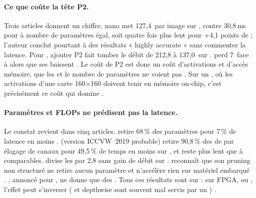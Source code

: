 \paragraph{Ce que coûte la tête P2.} Trois articles donnent un chiffre.  nano
met 127,4\, par image sur , contre 30,8\,ms pour  à nombre de
paramètres égal, soit quatre fois plus lent pour +4,1 points de 
\citep[Table~6]{2023-zhang-drone-yolo-efficient-neural-network} ; l'auteur conclut
pourtant à des résultats « highly accurate » sans commenter la latence. Pour
, ajouter P2 fait tomber le débit de 212,8 à 137,0\, sur 
\citep[Table~5]{2023-fu-efficient-yolov7-drone-enhanced-object}.  perd 7\,
face à  alors que ses  baissent \citep[Table~3,
§5]{2023-cao-gcl-yolo-ghostconv-lightweight-yolo}. Le coût de P2 est donc un coût
d'activations et d'accès mémoire, que les  et le nombre de paramètres ne voient pas
\deduit. Sur un , où les activations d'une carte 160$\times$160 doivent tenir en
mémoire on-chip, c'est précisément ce coût qui domine \deduit.

\paragraph{Paramètres et FLOPs ne prédisent pas la latence.} Le constat revient dans cinq
articles.  retire 68\,\% des paramètres pour 7\,\% de latence en moins
\citep[Table~3]{2022-liu-sf-yolov5-lightweight-small-object}. 
\citep{arxiv-1907.11093-slimyolov3-narrower-faster-better-real}\pp{} (version ICCVW~2019
probable) retire 90,8\,\% des  de  par élagage de canaux pour 49,5\,\% de
temps en moins sur  , et reste plus lent que  à 
comparables.  divise les  par 2,8 sans gain de débit sur 
\citep[Table~2]{2025-du-f-yolov7-fast-robust-real}.  reconnaît que son
pruning non structuré ne retire aucun paramètre et n'accélère rien sur matériel embarqué
\citep[§5]{arxiv-2604.13278-dronescan-yolo-redundancy-aware-lightweight}. ,
annoncé pour , ne donne que des 
\citep[§IV-D8]{2025-yu-yolo-gcof-lightweight-low-altitude}. Tous ces résultats sont sur
 : sur FPGA,  ou , l'effet peut s'inverser ( et depthwise
sont souvent mal servis par un ) \deduit.

